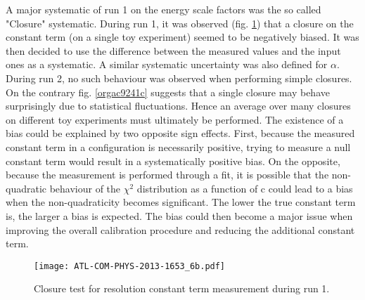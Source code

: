 A major systematic of run 1 on the energy scale factors was the so called "Closure" systematic.
During run 1, it was observed \cite{ATL-COM-PHYS-2013-1653} (fig. \ref{fig:orgc7de0ae}) that a closure on the constant term (on a single toy experiment) seemed to be negatively biased.
It was then decided to use the difference between the measured values and the input ones as a systematic.
A similar systematic uncertainty was also defined for $\alpha$.
During run 2, no such behaviour was observed when performing simple closures.
On the contrary fig. \ref{orgac9241c} suggests that a single closure may behave surprisingly due to statistical fluctuations.
Hence an average over many closures on different toy experiments must ultimately be performed.
The existence of a bias could be explained by two opposite sign effects.
First, because the measured constant term in a configuration is necessarily positive, trying to measure a null constant term would result in a systematically positive bias.
On the opposite, because the measurement is performed through a fit, it is possible that the non-quadratic behaviour of the $\chi^2$ distribution as a function of c could lead to a bias when the non-quadraticity becomes significant.
The lower the true constant term is, the larger a bias is expected.
The bias could then become a major issue when improving the overall calibration procedure and reducing the additional constant term.

\begin{figure}[htbp]
\centering
\texttt{[image: ATL-COM-PHYS-2013-1653\_6b.pdf]}
\caption{\label{fig:orgc7de0ae}
Closure test for resolution constant term measurement during run 1.\cite{ATL-COM-PHYS-2013-1653}}
\end{figure}

